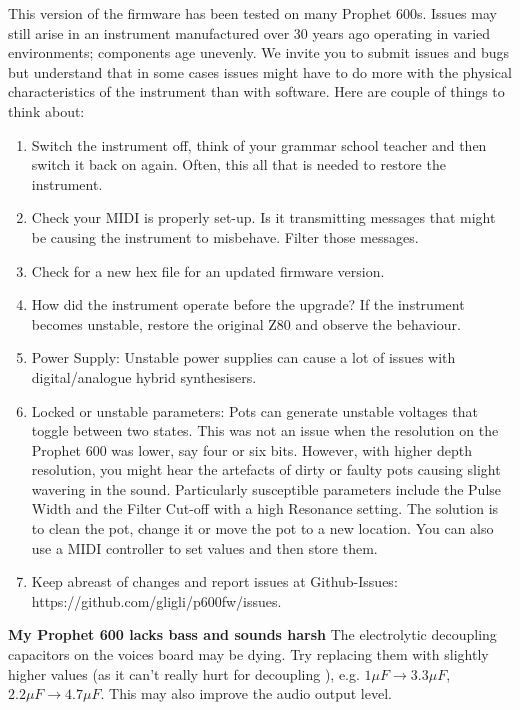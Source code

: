 This version of the firmware has been tested on many Prophet 600s.  Issues may still arise in an instrument manufactured over 30 years ago operating in varied environments; components age unevenly.  We invite you to submit issues and bugs but understand that in some cases issues might have to do more with the physical characteristics of the instrument than with software.  Here are couple of things to think about:

\begin{enumerate}
  \setlength\itemsep{0cm}
  \item Switch the instrument off, think of your grammar school teacher and then switch it back on again. Often, this all that is needed to restore the instrument. 
  \item Check your MIDI is properly set-up.  Is it transmitting messages that might be causing the instrument to misbehave.  Filter those messages.
  \item Check for a new hex file for an updated firmware version.
  \item How did the instrument operate before the upgrade?  If the instrument becomes unstable, restore the original Z80 and observe the behaviour.
  \item Power Supply: Unstable power supplies can cause a lot of issues with digital/analogue hybrid synthesisers.
  \item Locked or unstable parameters: Pots can generate unstable voltages that toggle between two states.  This was not an issue when the resolution on the Prophet 600 was lower, say four or six bits.  However, with higher depth resolution, you might hear the artefacts of dirty or faulty pots causing slight wavering in the sound.  Particularly susceptible parameters include the Pulse Width and the Filter Cut-off with a high Resonance setting.  The solution is to clean the pot, change it or move the pot to a new location.  You can also use a MIDI controller to set values and then store them.   
  \item Keep abreast of changes and report issues at Github-Issues: https://github.com/gligli/p600fw/issues. 
    
\end{enumerate}

\textbf{My Prophet 600 lacks bass and sounds harsh}
The electrolytic decoupling capacitors on the voices board may be dying. Try replacing them with slightly higher values (as it can't really hurt for decoupling ), 
e.g. $1\mu F \to 3.3\mu F$, $2.2\mu F \to 4.7\mu F$. This may also improve the audio output level.
